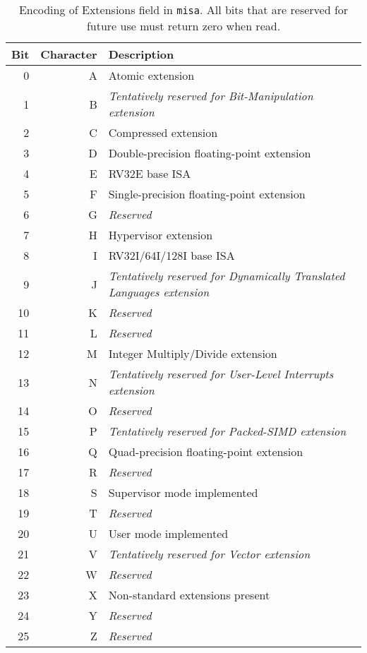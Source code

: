 \begin{table*}
\begin{center}
\begin{tabular}{|r|r|l|}
\hline
Bit & Character  & Description \\
\hline
  0 & A & Atomic extension \\
  1 & B & {\em Tentatively reserved for Bit-Manipulation extension} \\
  2 & C & Compressed extension \\
  3 & D & Double-precision floating-point extension \\
  4 & E & RV32E base ISA \\
  5 & F & Single-precision floating-point extension \\
  6 & G & {\em Reserved} \\
  7 & H & Hypervisor extension \\
  8 & I & RV32I/64I/128I base ISA \\
  9 & J & {\em Tentatively reserved for Dynamically Translated Languages extension} \\
 10 & K & {\em Reserved} \\
 11 & L & {\em Reserved} \\
 12 & M & Integer Multiply/Divide extension \\
 13 & N & {\em Tentatively reserved for User-Level Interrupts extension} \\
 14 & O & {\em Reserved} \\
 15 & P & {\em Tentatively reserved for Packed-SIMD extension} \\
 16 & Q & Quad-precision floating-point extension \\
 17 & R & {\em Reserved} \\
 18 & S & Supervisor mode implemented \\
 19 & T & {\em Reserved} \\
 20 & U & User mode implemented \\
 21 & V & {\em Tentatively reserved for Vector extension} \\
 22 & W & {\em Reserved} \\
 23 & X & Non-standard extensions present \\
 24 & Y & {\em Reserved} \\
 25 & Z & {\em Reserved} \\
\hline
\end{tabular}
\end{center}
\caption{Encoding of Extensions field in {\tt misa}.  All bits that are
  reserved for future use must return zero when read.}
\label{misaletters}
\end{table*}

